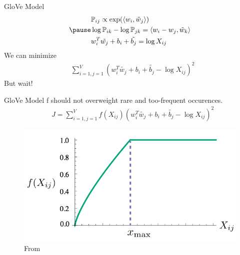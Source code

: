\begin{frame}{GloVe Model}
  \begin{align*}
    & \Pr_{ij} \propto \exp(\dotprod{w_i}{\tilde{w}_j}) \\
    \pause
    & \log \Pr_{ik} - \log\Pr_{jk} = \dotprod{w_i -w_j}{\tilde{w}_k}\\
    & w_i^T\tilde{w_j} +b_i + \tilde{b_j} = \log X_{ij} \\
  \end{align*}
  \pause
  We can minimize 
  \begin{align*}
    & \text{} \sum_{i=1,j=1}^V \left( w_i^T\tilde{w_j} +b_i + \tilde{b_j} - \log X_{ij} \right)^2
  \end{align*}
  \pause
  But wait!
\end{frame}

\begin{frame}{GloVe Model}
  f should not overweight rare and too-frequent occurences.
  \begin{align*}
    & J = \sum_{i=1,j=1}^V f(X_{ij}) \left( w_i^T\tilde{w_j} +b_i + \tilde{b_j} - \log X_{ij} \right)^2
  \end{align*}
  \begin{figure}
    \includegraphics[scale=0.27]{images/weighting.png}
    \caption{From}
  \end{figure}
\end{frame}


